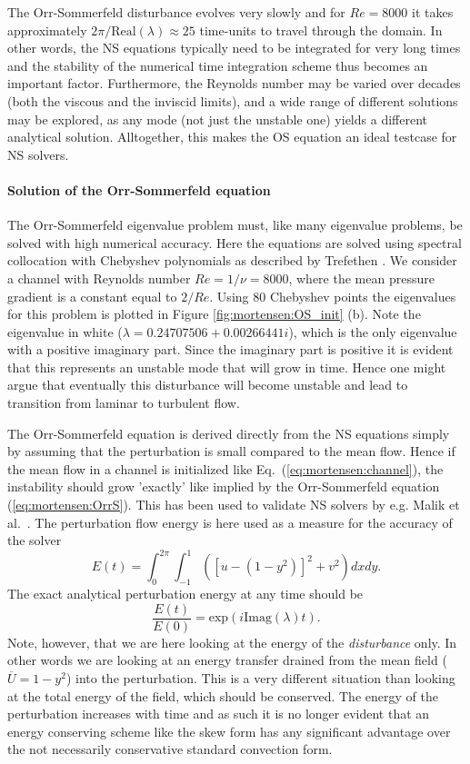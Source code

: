 The Orr-Sommerfeld disturbance evolves very slowly and for $Re=8000$ it takes approximately $2 \pi/\text{Real}(\lambda)\approx 25$ time-units to travel through the domain. In other words, the NS equations typically need to be integrated for very long times and the stability of the numerical time integration scheme thus becomes an important factor. Furthermore, the Reynolds number may be varied over decades (both the viscous and the inviscid limits), and a wide range of different solutions may be explored, as any mode (not just the unstable one) yields a different analytical solution. Alltogether, this makes the OS equation an ideal testcase for NS solvers.

\paragraph{Solution of the Orr-Sommerfeld equation}

The Orr-Sommerfeld eigenvalue problem must, like many eigenvalue problems, be solved with high numerical accuracy. Here the equations are solved using spectral collocation with Chebyshev polynomials as described by Trefethen \cite{tref06}. We consider a channel with Reynolds number $Re=1/\nu=8000$, where the mean pressure gradient is a constant equal to $2/Re$. Using 80 Chebyshev points the eigenvalues for this problem is plotted in Figure \ref{fig:mortensen:OS_init} (b). Note the eigenvalue in white ($\lambda = 0.24707506+0.00266441 i$), which is the only eigenvalue with a positive imaginary part. Since the imaginary part is positive it is evident that this represents an unstable mode that will grow in time. Hence one might argue that eventually this disturbance will become unstable and lead to transition from laminar to turbulent flow.

The Orr-Sommerfeld equation is derived directly from the NS equations simply by assuming that the perturbation is small compared to the mean flow. Hence if the mean flow in a channel is initialized like Eq.~(\eqref{eq:mortensen:channel}), the instability should grow 'exactly' like implied by the Orr-Sommerfeld equation (\eqref{eq:mortensen:OrrS}). This has been used to validate NS solvers by e.g. Malik et al.~\cite{Malik1984}. The perturbation flow energy is here used as a measure for the accuracy of the solver
\begin{equation}
  E(t)= \int_0^{2\pi}\int_{-1}^{1} \left( \left[u-(1-y^2)\right]^2 + v^2 \right) dx dy.
\end{equation}
The exact analytical perturbation energy at any time should be 
\[ \frac{E(t)}{E(0)}=\text{exp}(i \text{Imag}(\lambda) t).\]
Note, however, that we are here looking at the energy of the \textit{disturbance} only. In other words we are looking at an energy transfer drained from the mean field ($\overline{U}=1-y^2$) into the perturbation. This is a very different situation than looking at the total energy of the field, which should be conserved. The energy of the perturbation increases with time and as such it is no longer evident that an energy conserving scheme like the skew form has any significant advantage over the not necessarily conservative standard convection form.

